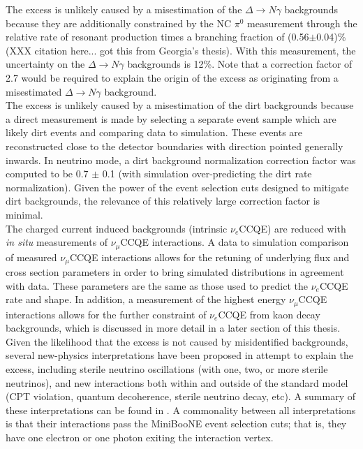 The excess is unlikely caused by a misestimation of the $\Delta\rightarrow N\gamma$ backgrounds because they are additionally constrained by the NC $\pi^0$ measurement through the relative rate of resonant production times a branching fraction of (0.56$\pm$0.04)\% (XXX citation here... got this from Georgia's thesis). With this measurement, the uncertainty on the $\Delta\rightarrow N\gamma$ backgrounds is 12\%. Note that a correction factor of 2.7 would be required to explain the origin of the excess as originating from a misestimated $\Delta \rightarrow N\gamma$ background.\\

The excess is unlikely caused by a misestimation of the dirt backgrounds because a direct measurement is made by selecting a separate event sample which are likely dirt events and comparing data to simulation. These events are reconstructed close to the detector boundaries with direction pointed generally inwards. In neutrino mode, a dirt background normalization correction factor was computed to be 0.7 $\pm$ 0.1 (with simulation over-predicting the dirt rate normalization). Given the power of the event selection cuts designed to mitigate dirt backgrounds, the relevance of this relatively large correction factor is minimal.\\

The charged current induced backgrounds (intrinsic $\nu_e$CCQE) are reduced with \textit{in situ} measurements of $\nu_\mu$CCQE interactions. A data to simulation comparison of measured $\nu_\mu$CCQE interactions allows for the retuning of underlying flux and cross section parameters in order to bring simulated distributions in agreement with data. These parameters are the same as those used to predict the $\nu_e$CCQE rate and shape. In addition, a measurement of the highest energy $\nu_\mu$CCQE interactions allows for the further constraint of $\nu_e$CCQE from kaon decay backgrounds, which is discussed in more detail in a later section of this thesis.\\

Given the likelihood that the excess is not caused by misidentified backgrounds, several new-physics interpretations have been proposed in attempt to explain the excess, including sterile neutrino oscillations (with one, two, or more sterile neutrinos), and new interactions both within and outside of the standard model (CPT violation, quantum decoherence, sterile neutrino decay, etc). A summary of these interpretations can be found in \cite{MBLEESourcesOverview}. A commonality between all interpretations is that their interactions pass the MiniBooNE event selection cuts; that is, they have one electron or one photon exiting the interaction vertex.

